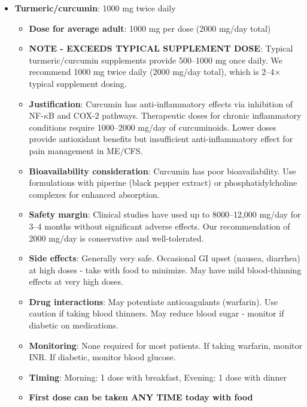 \begin{enumerate}
\begin{itemize}
        \item \textbf{Turmeric/curcumin}: 1000 mg twice daily
        \begin{itemize}
            \item \textbf{Dose for average adult}: 1000 mg per dose (2000 mg/day total)
            \item \textbf{NOTE - EXCEEDS TYPICAL SUPPLEMENT DOSE}: Typical turmeric/curcumin supplements provide 500--1000 mg once daily. We recommend 1000 mg twice daily (2000 mg/day total), which is 2--4$\times$ typical supplement dosing.
            \item \textbf{Justification}: Curcumin has anti-inflammatory effects via inhibition of NF-$\kappa$B and COX-2 pathways. Therapeutic doses for chronic inflammatory conditions require 1000--2000 mg/day of curcuminoids. Lower doses provide antioxidant benefits but insufficient anti-inflammatory effect for pain management in ME/CFS.
            \item \textbf{Bioavailability consideration}: Curcumin has poor bioavailability. Use formulations with piperine (black pepper extract) or phosphatidylcholine complexes for enhanced absorption.
            \item \textbf{Safety margin}: Clinical studies have used up to 8000--12{,}000 mg/day for 3--4 months without significant adverse effects. Our recommendation of 2000 mg/day is conservative and well-tolerated.
            \item \textbf{Side effects}: Generally very safe. Occasional GI upset (nausea, diarrhea) at high doses - take with food to minimize. May have mild blood-thinning effects at very high doses.
            \item \textbf{Drug interactions}: May potentiate anticoagulants (warfarin). Use caution if taking blood thinners. May reduce blood sugar - monitor if diabetic on medications.
            \item \textbf{Monitoring}: None required for most patients. If taking warfarin, monitor INR. If diabetic, monitor blood glucose.
            \item \textbf{Timing}: Morning: 1 dose with breakfast, Evening: 1 dose with dinner
            \item \textbf{First dose can be taken ANY TIME today with food}
        \end{itemize}


\end{itemize}
\end{enumerate}
